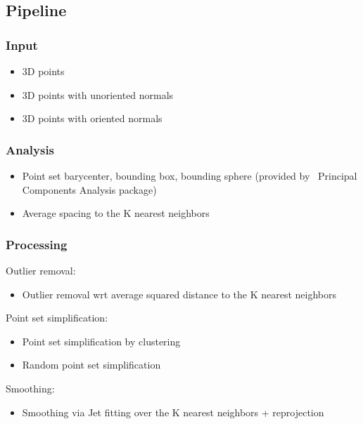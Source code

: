 \subsection{Pipeline}

\subsubsection{Input}

\begin{itemize}
\item 3D points
\item 3D points with unoriented normals
\item 3D points with oriented normals
\end{itemize}


\subsubsection{Analysis}

\begin{itemize}
\item Point set barycenter, bounding box, bounding sphere (provided by \cgal\ Principal Components Analysis package)
\item Average spacing to the K nearest neighbors
\end{itemize}


\subsubsection{Processing}

Outlier removal:

\begin{itemize}
\item Outlier removal wrt average squared distance to the K nearest neighbors
\end{itemize}

Point set simplification:

\begin{itemize}
\item Point set simplification by clustering
\item Random point set simplification
\end{itemize}

Smoothing:

\begin{itemize}
\item Smoothing via Jet fitting over the K nearest neighbors + reprojection
\end{itemize}


